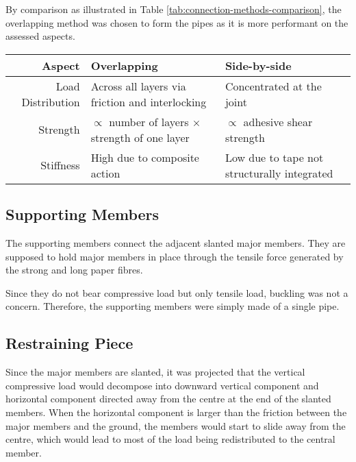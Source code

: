 \documentclass[fleqn,10pt]{SelfArx} %
\begin{document}
By comparison as illustrated in Table \ref{tab:connection-methods-comparison}, the overlapping
	method was chosen to form the pipes as it is more performant on the assessed aspects.

\begin{table*}[hbt]
	\caption{Compaison of the overlapping and side-by-side connection methods.}
	\centering
	\begin{tabular}{rll}
		\toprule
		Aspect & \textbf{Overlapping} & \textbf{Side-by-side} \\
		\midrule
		Load Distribution & Across all layers via friction and interlocking & Concentrated at the joint \\
		Strength & $\propto$ number of layers $\times$ strength of one layer & $\propto$ adhesive shear strength \\
		Stiffness & High due to composite action & Low due to tape not structurally integrated \\
		\bottomrule
	\end{tabular}
	\label{tab:connection-methods-comparison}
\end{table*}

\subsection{Supporting Members}
\label{sec:supporting-members}

The supporting members connect the adjacent slanted major members. They are supposed to
	hold major members in place through the tensile force generated by the strong and long
	paper fibres.

Since they do not bear compressive load but only tensile load, buckling was not a concern.
	Therefore, the supporting members were simply made of a single pipe.

\subsection{Restraining Piece}

Since the major members are slanted, it was projected that the vertical compressive load
	would decompose into downward vertical component and horizontal component directed
	away from the centre at the end of the slanted members. When the horizontal component
	is larger than the friction between the major members and the ground, the members would
	start to slide away from the centre, which would lead to most of the load being
	redistributed to the central member.
\end{document}
